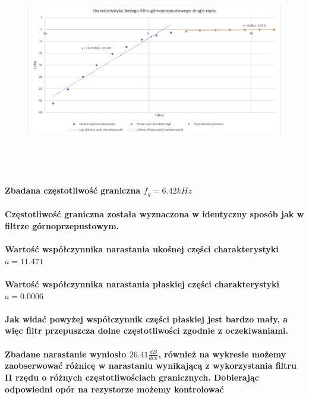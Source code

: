 \documentclass[a4paper,12pt]{article}
\begin{document}
\begin{justify}
\begin{figure}[h]
\centering
\includegraphics[width=15cm, height=9cm]{3_wykr}
\end{figure}

\paragraph{Zbadana częstotliwość graniczna $f_{g} = 6.42kHz$}

\paragraph{Częstotliwość graniczna została wyznaczona w identyczny sposób jak w filtrze górnoprzepustowym.}

\paragraph{Wartość współczynnika narastania ukośnej części charakterystyki $a = 11.471$}
\paragraph{Wartość współczynnika narastania płaskiej części charakterystyki $a = 0.0006$}

\paragraph{Jak widać powyżej współczynnik części płaskiej jest bardzo mały, a więc filtr przepuszcza dolne częstotliwości zgodnie z oczekiwaniami. }

\paragraph{Zbadane narastanie wyniosło $26.41 \frac{dB}{dek}$, również na wykresie możemy zaobserwować różnicę w narastaniu wynikającą z wykorzystania filtru II rzędu o różnych częstotliwościach granicznych. Dobierając odpowiedni opór na rezystorze możemy kontrolować }


\end{justify}
\end{document}
